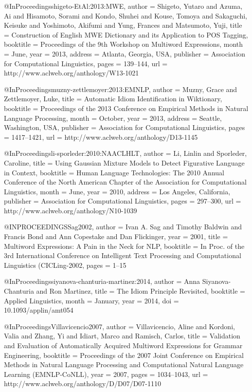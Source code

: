 @InProceedings{shigeto-EtAl:2013:MWE,
  author    = {Shigeto, Yutaro  and  Azuma, Ai  and  Hisamoto, Sorami  and  Kondo, Shuhei  and  Kouse, Tomoya  and  Sakaguchi, Keisuke  and  Yoshimoto, Akifumi  and  Yung, Frances  and  Matsumoto, Yuji},
  title     = {Construction of {English} {MWE} Dictionary and its Application to {POS} Tagging},
  booktitle = {Proceedings of the 9th Workshop on Multiword Expressions},
  month     = {June},
  year      = {2013},
  address   = {Atlanta, Georgia, USA},
  publisher = {Association for Computational Linguistics},
  pages     = {139--144},
  url       = {http://www.aclweb.org/anthology/W13-1021}
}


@InProceedings{muzny-zettlemoyer:2013:EMNLP,
  author    = {Muzny, Grace  and  Zettlemoyer, Luke},
  title     = {Automatic Idiom Identification in {Wiktionary}},
  booktitle = {Proceedings of the 2013 Conference on Empirical Methods in Natural Language Processing},
  month     = {October},
  year      = {2013},
  address   = {Seattle, Washington, USA},
  publisher = {Association for Computational Linguistics},
  pages     = {1417--1421},
  url       = {http://www.aclweb.org/anthology/D13-1145}
}

@InProceedings{li-sporleder:2010:NAACLHLT,
  author    = {Li, Linlin  and  Sporleder, Caroline},
  title     = {Using Gaussian Mixture Models to Detect Figurative Language in Context},
  booktitle = {Human Language Technologies: The 2010 Annual Conference of the North American Chapter of the Association for Computational Linguistics},
  month     = {June},
  year      = {2010},
  address   = {Los Angeles, California},
  publisher = {Association for Computational Linguistics},
  pages     = {297--300},
  url       = {http://www.aclweb.org/anthology/N10-1039}
}

@INPROCEEDINGS{Sag2002,
    author = {Ivan A. Sag and Timothy Baldwin and Francis Bond and Ann Copestake and Dan Flickinger},
    year = {2001},
    title = {Multiword Expressions: A Pain in the Neck for NLP},
    booktitle = {In Proc. of the 3rd International Conference on Intelligent Text Processing and Computational Linguistics (CICLing-2002},
    pages = {1--15}
}

@InProceedings{siyanova-chanturia-martinez:2014,
  author    = {Anna Siyanova-Chanturia  and Ron Martinez},
  title     = {The Idiom Principle Revisited},
  booktitle = {Applied Linguistics},
  month     = {January},
  year      = {2014},
  doi = {10.1093/applin/amt054}
}

@InProceedings{Villavicencio2007,
  author    = {Villavicencio, Aline  and  Kordoni, Valia  and  Zhang, Yi  and  Idiart, Marco  and  Ramisch, Carlos},
  title     = {Validation and Evaluation of Automatically Acquired Multiword Expressions for Grammar Engineering},
  booktitle = {Proceedings of the 2007 Joint Conference on Empirical Methods in Natural Language Processing and Computational Natural Language Learning (EMNLP-CoNLL)},
  year = {2007},
  pages     = {1034--1043},
  url       = {http://www.aclweb.org/anthology/D/D07/D07-1110}
}

